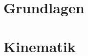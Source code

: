 \documentclass[a4paper, 12pt, oneside]{book}
\begin{document}
\tableofcontents

\chapter{Grundlagen}








%
%
%
%
%
%
%
%

\chapter{Kinematik}


%
%
%
%
%
%
%
%
%
%
%
%
%
%

%
%
%
%
%
%
%
%
\end{document}
